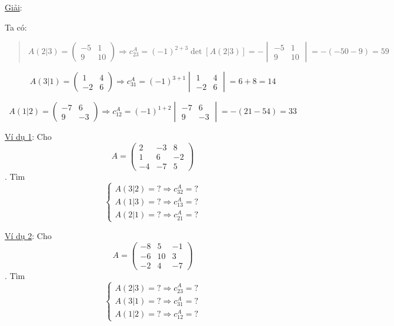 \documentclass[
]{article}
\let\ul\uline
\begin{document}
\ul{Giải}:

Ta có:

\begin{quote}
$$A(2|3) = \begin{pmatrix} -5 & 1 \\ 9 & 10 \end{pmatrix} \Rightarrow c_{23}^A = (-1)^{2+3} \det[A(2|3)] = - \begin{vmatrix} -5 & 1 \\ 9 & 10 \end{vmatrix} = -(-50 - 9) = 59$$
\end{quote}

$$A(3|1) = \begin{pmatrix} 1 & 4 \\ -2 & 6 \end{pmatrix} \Rightarrow c_{31}^A = (-1)^{3+1} \begin{vmatrix} 1 & 4 \\ -2 & 6 \end{vmatrix} = 6 + 8 = 14$$

$$A(1|2) = \begin{pmatrix} -7 & 6 \\ 9 & -3 \end{pmatrix} \Rightarrow c_{12}^A = (-1)^{1+2} \begin{vmatrix} -7 & 6 \\ 9 & -3 \end{vmatrix} = -(21 - 54) = 33$$

\ul{Ví dụ 1}: Cho
$$A = \begin{pmatrix} 2 & -3 & 8 \\ 1 & 6 & -2 \\ -4 & -7 & 5 \end{pmatrix}$$. Tìm
$$\begin{cases} A(3|2) = ? \Rightarrow c_{32}^A = ? \\ A(1|3) = ? \Rightarrow c_{13}^A = ? \\ A(2|1) = ? \Rightarrow c_{21}^A = ? \end{cases}$$

\ul{Ví dụ 2}: Cho
$$A = \begin{pmatrix} -8 & 5 & -1 \\ -6 & 10 & 3 \\ -2 & 4 & -7 \end{pmatrix}$$. Tìm
$$\begin{cases} A(2|3) = ? \Rightarrow c_{23}^A = ? \\ A(3|1) = ? \Rightarrow c_{31}^A = ? \\ A(1|2) = ? \Rightarrow c_{12}^A = ? \end{cases}$$
\end{document}
